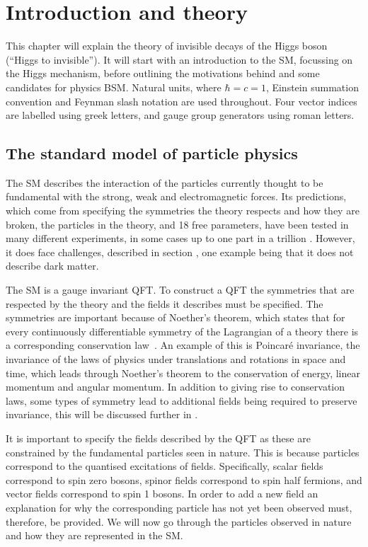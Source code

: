 \chapter{Introduction and theory}
\label{chap:theory}
This chapter will explain the theory of invisible decays of the Higgs boson (``Higgs to invisible''). It will start with an introduction to the \ac{SM}, focussing on the Higgs mechanism, before outlining the motivations behind and some candidates for physics \ac{BSM}. Natural units, where $\hbar=c=1$, Einstein summation convention and Feynman slash notation are used throughout. Four vector indices are labelled using greek letters, and gauge group generators using roman letters.

\section{The standard model of particle physics}
\label{sec:SM}
The SM describes the interaction of the particles currently thought to be fundamental with the strong, weak and electromagnetic forces. Its predictions, which come from specifying the symmetries the theory respects and how they are broken, the particles in the theory, and 18 free parameters, have been tested in many different experiments, in some cases up to one part in a trillion \cite{PhysRevLett.100.120801}. However, it does face challenges, described in section , one example being that it does not describe dark matter. 

The SM is a gauge invariant \ac{QFT}. To construct a QFT the symmetries that are respected by the theory and the fields it describes must be specified. The symmetries are important because of Noether's theorem, which states that for every continuously differentiable symmetry of the Lagrangian of a theory there is a corresponding conservation law~\cite{Noether:1918zz,doi:10.1080/00411457108231446}. An example of this is Poincar\'e invariance, the invariance of the laws of physics under translations and rotations in space and time, which leads through Noether's theorem to the conservation of energy, linear momentum and angular momentum. In addition to giving rise to conservation laws, some types of symmetry lead to additional fields being required to preserve invariance, this will be discussed further in  \cite{PhysRev.96.191}.

It is important to specify the fields described by the QFT as these are constrained by the fundamental particles seen in nature. This is because particles correspond to the quantised excitations of fields. Specifically, scalar fields correspond to spin zero bosons, spinor fields correspond to spin half fermions, and vector fields correspond to spin 1 bosons. In order to add a new field an explanation for why the corresponding particle has not yet been observed must, therefore, be provided. We will now go through the particles observed in nature and how they are represented in the SM.

